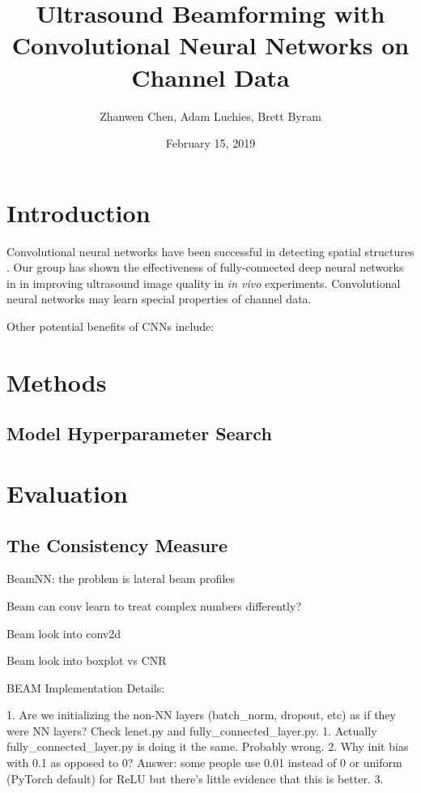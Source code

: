 \documentclass{article}
\title{Ultrasound Beamforming with Convolutional Neural Networks on Channel Data}
\author{Zhanwen Chen, Adam Luchies, Brett Byram}
\affil{Vanderbilt University}
\date{February 15, 2019}
\begin{document}
\maketitle

\section{Introduction}

Convolutional neural networks have been successful in detecting spatial
structures \cite{??}. Our group has shown the effectiveness of fully-connected
deep neural networks in \cite{???} in improving ultrasound image quality in
\textit{in vivo} experiments. Convolutional neural networks may learn special
properties of channel data.

Other potential benefits of CNNs include:


\section{Methods}

\subsection{Model Hyperparameter Search}

\section{Evaluation}

\subsection{The Consistency Measure}








BeamNN: the problem is lateral beam profiles

Beam can conv learn to treat complex numbers differently?

Beam look into conv2d

Beam look into boxplot vs CNR

BEAM Implementation Details:

1. Are we initializing the non-NN layers (batch_norm, dropout, etc) as if they were NN layers? Check lenet.py and fully_connected_layer.py.
    1. Actually fully_connected_layer.py is doing it the same. Probably wrong.
2. Why init bias with 0.1 as opposed to 0? Answer: some people use 0.01 instead of 0 or uniform (PyTorch default)  for ReLU but there’s little evidence that this is better.
3.
\end{document}
